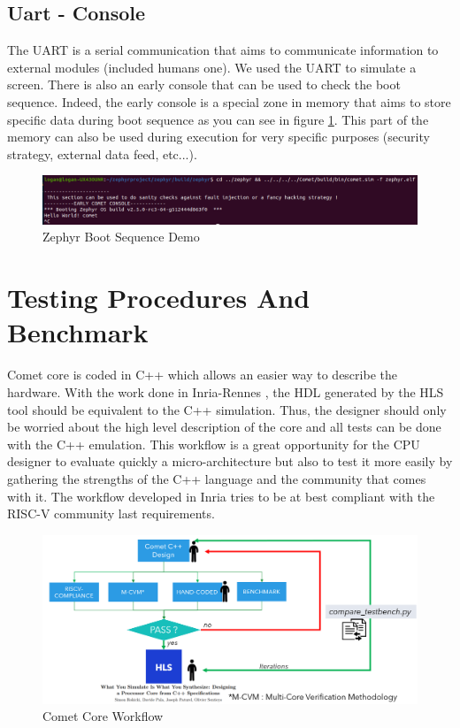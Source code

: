 \documentclass[10pt,letterpaper]{article}
\begin{document}
\subsection{Uart - Console}

The UART is a serial communication that aims to communicate information to external modules (included humans one). We used the UART to simulate a screen. There is also an early console that can be used to check the boot sequence. Indeed, the early console is a special zone in memory that aims to store specific data during boot sequence as you can see in figure \ref{fig:zephyrboot_img}. This part of the memory can also be used during execution for very specific purposes (security strategy, external data feed, etc...).\\

\begin{figure}[H]
\centering
\includegraphics[width=16cm]{img/hello_world_comet_zephyr.png}
\caption{Zephyr Boot Sequence Demo}
\label{fig:zephyrboot_img}
\end{figure}

\section{Testing Procedures And Benchmark}\vspace{0.3cm}

Comet core is coded in C++ which allows an easier way to describe the hardware. With the work done in Inria-Rennes \cite{paper}, the HDL generated by the HLS tool should be equivalent to the C++ simulation. Thus, the designer should only be worried about the high level description of the core and all tests can be done with the C++ emulation. This workflow is a great opportunity for the CPU designer to evaluate quickly a micro-architecture but also to test it more easily by gathering the strengths of the C++ language and the community that comes with it. The workflow developed in Inria tries to be at best compliant with the RISC-V community last requirements. 

\begin{figure}[H]
\centering
\includegraphics[width=15cm]{img/comet_workflow.PNG}
\caption{Comet Core Workflow}
\label{fig:comet_workflow}
\end{figure}
\end{document}
